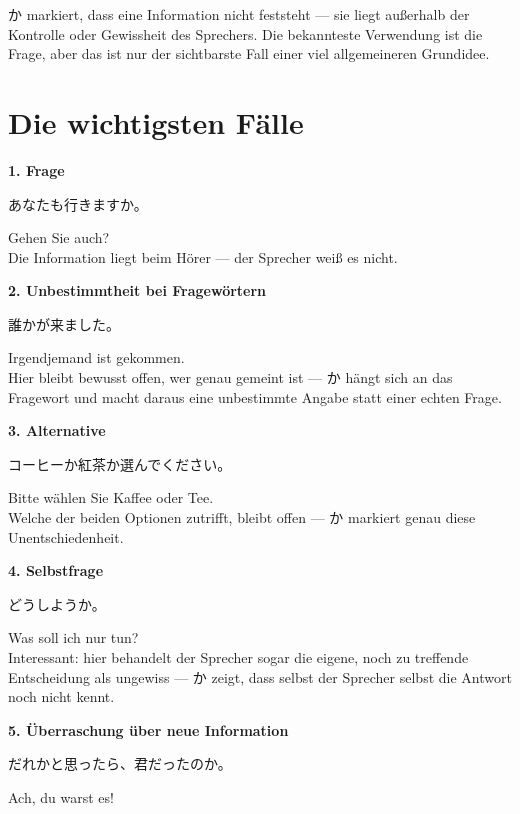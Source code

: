 \documentclass[12pt]{book}
\begin{document}
か markiert, dass eine Information nicht feststeht — sie liegt außerhalb der Kontrolle oder Gewissheit des Sprechers. Die bekannteste Verwendung ist die Frage, aber das ist nur der sichtbarste Fall einer viel allgemeineren Grundidee.

\section*{Die wichtigsten Fälle}

\textbf{1. Frage}
\par\quad あなたも行きますか。\\
\par\quad Gehen Sie auch?\\

Die Information liegt beim Hörer — der Sprecher weiß es nicht.

\textbf{2. Unbestimmtheit bei Fragewörtern}
\par\quad 誰かが来ました。\\
\par\quad Irgendjemand ist gekommen.\\

Hier bleibt bewusst offen, wer genau gemeint ist — か hängt sich an das Fragewort und macht daraus eine unbestimmte Angabe statt einer echten Frage.

\textbf{3. Alternative}
\par\quad コーヒーか紅茶か選んでください。\\
\par\quad Bitte wählen Sie Kaffee oder Tee.\\

Welche der beiden Optionen zutrifft, bleibt offen — か markiert genau diese Unentschiedenheit.

\textbf{4. Selbstfrage}
\par\quad どうしようか。\\
\par\quad Was soll ich nur tun?\\

Interessant: hier behandelt der Sprecher sogar die eigene, noch zu treffende Entscheidung als ungewiss — か zeigt, dass selbst der Sprecher selbst die Antwort noch nicht kennt.

\textbf{5. Überraschung über neue Information}
\par\quad だれかと思ったら、君だったのか。\\
\par\quad Ach, du warst es!\\
\end{document}
